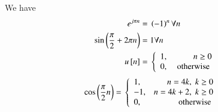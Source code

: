 \documentclass[journal,12pt,twocolumn]{IEEEtran}
\begin{document}
We have 
\begin{align}
\label{eq:2}
e^{j \pi n} ={}& \left(-1\right)^n \forall n\\
\label{eq:3}
\sin\left(\frac{\pi}{2}+2 \pi n\right) = {}& 1 \forall n\\
\label{eq:4}
u{}\left[n\right]={}& \left\{
  \begin{array}{lr} 
      1, & n\geq 0 \\
      0, & \text{ otherwise }
      \end{array}
\right.
\end{align}
\begin{align}
\label{eq:5}
\cos\left(\frac{\pi}{2} n\right) = {}& \left\{
  \begin{array}{lr} 
      1, & n = 4k,\; k\geq 0 \\
      -1, & n = 4k+2,\; k \geq 0 \\
      0, & \text{ otherwise }
      \end{array}
\right.
\end{align}
\end{document}
